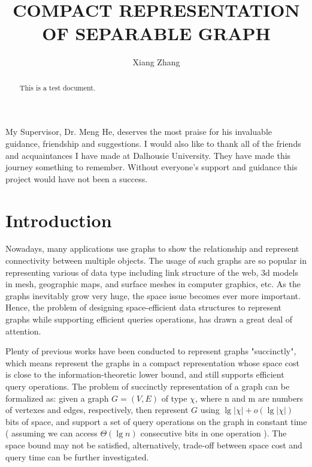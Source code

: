 \documentclass[12pt,glossary]{dalthesis}
\begin{document}
\macs  %
\title{COMPACT REPRESENTATION OF SEPARABLE GRAPH}
\author{Xiang Zhang}



\nolistoftables
\nolistoffigures

\frontmatter

\begin{abstract}
This is a test document.
\end{abstract}

\printglossary

\begin{acknowledgements}
My Supervisor, Dr. Meng He, deserves the most praise for his invaluable guidance, friendship and suggestions. I would also like to thank all of the friends and acquaintances I have made at Dalhousie University. They have made this journey something to remember. Without everyone’s support and guidance this project would have not been a success.
\end{acknowledgements}

\mainmatter

\chapter{Introduction}

Nowadays, many applications use graphs to show the relationship and represent connectivity between multiple objects. The usage of such graphs are so popular in representing various of data type including link structure of the web, 3d models in mesh, geographic maps, and surface meshes in computer graphics, etc. As the graphs inevitably grow very huge, the space issue becomes ever more important. Hence, the problem of designing space-efficient data structures to represent graphs while supporting efficient queries operations, has drawn a great deal of attention. 

\bigskip
Plenty of previous works have been conducted to represent graphs "succinctly", which means represent the graphs in a compact representation whose space cost is close to the information-theoretic lower bound, and still supports efficient query operations. The problem of succinctly representation of a graph can be formalized as: given a graph $G = (V, E)$ of type $\chi$, where n and m are numbers of vertexes and edges, respectively, then represent $G$ using $\lg | \chi | + o(\lg | \chi | )$ bits of space, and support a set of query operations on the graph in constant time ( assuming we can access $\Theta(\lg n)$ consecutive bits in one operation ). The space bound may not be satisfied, alternatively, trade-off between space cost and query time can be further investigated.  
\end{document}
